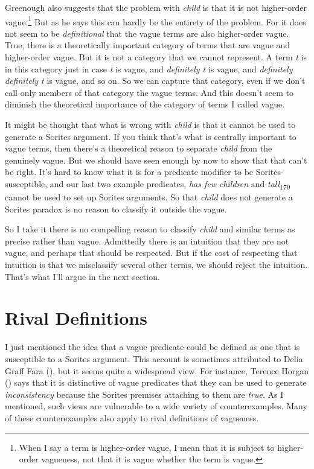 \documentclass[
  11pt,
  letterpaper,
  DIV=11,
  numbers=noendperiod,
  twoside]{scrartcl}
\begin{document}
Greenough also suggests that the problem with \emph{child} is that it is
not higher-order vague.\footnote{When I say a term is higher-order
  vague, I mean that it is subject to higher-order vagueness, not that
  it is vague whether the term is vague.} But as he says this can hardly
be the entirety of the problem. For it does not seem to be
\emph{definitional} that the vague terms are also higher-order vague.
True, there is a theoretically important category of terms that are
vague and higher-order vague. But it is not a category that we cannot
represent. A term \emph{t} is in this category just in case \emph{t} is
vague, and \emph{definitely t} is vague, and \emph{definitely definitely
t} is vague, and so on. So we can capture that category, even if we
don't call only members of that category the vague terms. And this
doesn't seem to diminish the theoretical importance of the category of
terms I called vague.

It might be thought that what is wrong with \emph{child} is that it
cannot be used to generate a Sorites argument. If you think that's what
is centrally important to vague terms, then there's a theoretical reason
to separate \emph{child} from the genuinely vague. But we should have
seen enough by now to show that that can't be right. It's hard to know
what it is for a predicate modifier to be Sorites-susceptible, and our
last two example predicates, \emph{has few children} and
\emph{tall}\textsubscript{179} cannot be used to set up Sorites
arguments. So that \emph{child} does not generate a Sorites paradox is
no reason to classify it outside the vague.

So I take it there is no compelling reason to classify \emph{child} and
similar terms as precise rather than vague. Admittedly there is an
intuition that they are not vague, and perhaps that should be respected.
But if the cost of respecting that intuition is that we misclassify
several other terms, we should reject the intuition. That's what I'll
argue in the next section.

\section{Rival Definitions}\label{sec-greenough}

I just mentioned the idea that a vague predicate could be defined as one
that is susceptible to a Sorites argument. This account is sometimes
attributed to Delia Graff Fara (), but it
seems quite a widespread view. For instance, Terence Horgan
() says that it is distinctive of vague
predicates that they can be used to generate \emph{inconsistency}
because the Sorites premises attaching to them are \emph{true}. As I
mentioned, such views are vulnerable to a wide variety of
counterexamples. Many of these counterexamples also apply to rival
definitions of vagueness.
\end{document}
